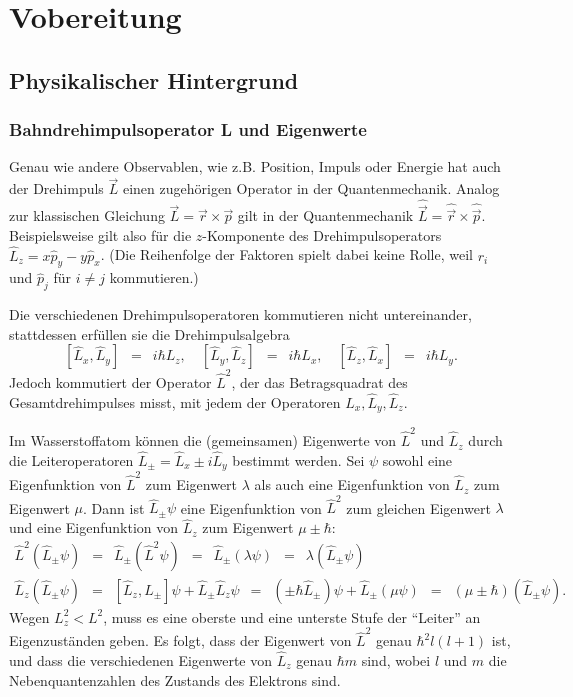\documentclass{article}
\newcommand{\widespace}{\enspace}
\newcommand{\wideeq}{\widespace = \widespace}
\begin{document}
\newpage

\section{Vobereitung}

\subsection{Physikalischer Hintergrund}

\subsubsection{Bahndrehimpulsoperator L und Eigenwerte}

Genau wie andere Observablen, wie z.B. Position, Impuls oder Energie hat auch der
Drehimpuls $\vec L$ einen zugehörigen Operator in der Quantenmechanik.
Analog zur klassischen Gleichung $\vec L = \vec r \times \vec p$
gilt in der Quantenmechanik $\hat{\vec L} = \hat{\vec r} \times \hat{\vec p}$.
Beispielsweise gilt also für die $z$-Komponente des Drehimpulsoperators
$\hat L_z = x \hat p_y - y \hat p_x$.
(Die Reihenfolge der Faktoren spielt dabei keine Rolle,
weil $r_i$ und $\hat p_j$ für $i \neq j$ kommutieren.)

Die verschiedenen Drehimpulsoperatoren kommutieren nicht untereinander,
stattdessen erfüllen sie die Drehimpulsalgebra
\[
    [\hat L_x, \hat L_y] \wideeq i \hbar L_z, \quad
    [\hat L_y, \hat L_z] \wideeq i \hbar L_x, \quad
    [\hat L_z, \hat L_x] \wideeq i \hbar L_y.
\]
Jedoch kommutiert der Operator $\hat L^2$, der das Betragsquadrat des
Gesamtdrehimpulses misst, mit jedem der Operatoren $\hat L_x, \hat L_y, \hat L_z$.

Im Wasserstoffatom können die (gemeinsamen) Eigenwerte von $\hat L^2$ und $\hat L_z$
durch die Leiteroperatoren $\hat L_{\pm} = \hat L_x \pm i \hat L_y$ bestimmt
werden. Sei $\psi$ sowohl eine Eigenfunktion von $\hat L^2$ zum Eigenwert $\lambda$
als auch eine Eigenfunktion von $\hat L_z$ zum Eigenwert $\mu$.
Dann ist $\hat L_\pm \psi$ eine Eigenfunktion von $\hat L^2$ zum gleichen Eigenwert
$\lambda$ und eine Eigenfunktion von $\hat L_z$ zum Eigenwert $\mu \pm \hbar$:
\begin{gather*}
    \hat L^2 (\hat L_\pm \psi) \wideeq \hat L_\pm (\hat L^2 \psi)
    \wideeq \hat L_\pm (\lambda \psi) \wideeq \lambda (\hat L_\pm \psi) \\
    \hat L_z (\hat L_\pm \psi) \wideeq [\hat L_z, L_\pm] \psi
    + \hat L_\pm \hat L_z \psi
    \wideeq (\pm \hbar \hat L_\pm) \psi + \hat L_\pm (\mu \psi)
    \wideeq (\mu \pm \hbar) (\hat L_\pm \psi).
\end{gather*}
Wegen $L_z^2 < L^2$, muss es eine oberste und eine unterste Stufe der ``Leiter''
an Eigenzuständen geben. Es folgt, dass der Eigenwert von $\hat L^2$ genau
$\hbar^2 l (l + 1)$ ist, und dass die verschiedenen Eigenwerte von $\hat L_z$
genau $\hbar m$ sind, wobei $l$ und $m$ die Nebenquantenzahlen des Zustands des
Elektrons sind.
\end{document}
